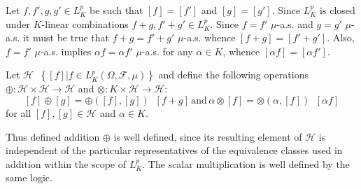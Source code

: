 \documentclass[a4paper]{article}
\newcommand{\obj}[1]{\left\{ #1 \right \}}
\newcommand{\clo}[1]{\left [ #1 \right ]}
\newcommand{\brac}[1]{\left ( #1 \right )}
\newcommand{\induc}[1]{\left . #1 \right \vert}
\newcommand{\Hcal}{\mathcal{H}}
\newcommand{\Fcal}{\mathcal{F}}
\newcommand{\defn}{\mathop{\overset{\Delta}{=}}\nolimits}
\begin{document}
Let $f,f',g,g'\in L^p_K$ be such that $\clo{f}=\clo{f'}$ and $\clo{g}=\clo{g'}$. Since $L^p_K$ is closed under $K$-linear combinations $f+g, f'+g'\in L^p_K$. Since $f=f'$ $\mu$-a.s. and $g=g'$ $\mu$-a.s. it must be true that $f+g=f'+g'$ $\mu$-a.s. whence $\clo{f+g}=\clo{f'+g'}$. Also, $f=f'$ $\mu$-a.s. implies $\alpha f=\alpha f'$ $\mu$-a.s. for any $\alpha\in K$, whence $\clo{\alpha f}=\clo{\alpha f'}$.

Let $\Hcal\defn \obj{ \induc{ \clo{f} } f\in L^p_K\brac{\Omega, \Fcal, \mu} }$ and define the following operations $\oplus:\Hcal\times \Hcal\to\Hcal$ and $\otimes:K\times\Hcal\to\Hcal$: \[\clo{f}\oplus\clo{g} = \oplus\brac{\clo{f},\clo{g}} \defn \clo{f+g}\,\text{and}\,\alpha\otimes\clo{f} = \otimes\brac{\alpha, \clo{f}} \defn \clo{\alpha f}\] for all $\clo{f},\clo{g}\in \Hcal$ and $\alpha\in K$.

Thus defined addition $\oplus$ is well defined, since its resulting element of $\Hcal$ is independent of the particular representatives of the equivalence classes used in addition within the scope of $L^p_K$. The scalar multiplication is well defined by the same logic.
\end{document}
